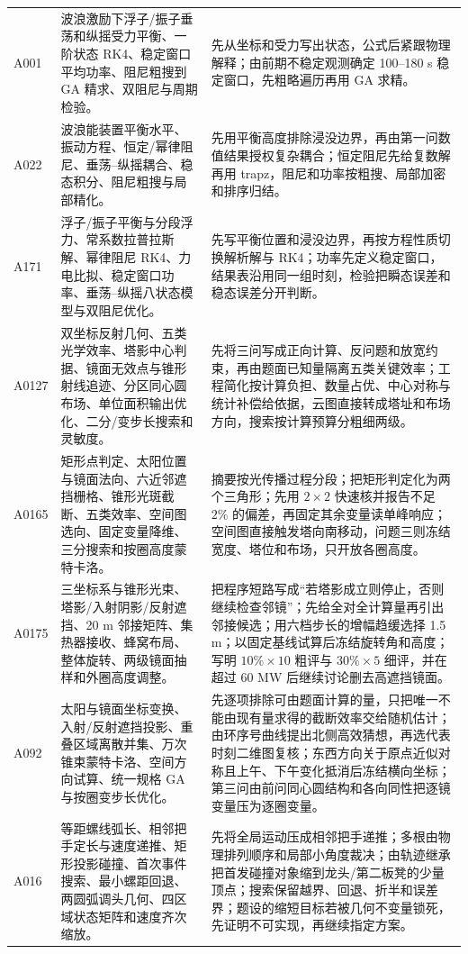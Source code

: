 \begin{longtable}{p{1.4cm}p{5.2cm}p{7.0cm}}
A001 & 波浪激励下浮子/振子垂荡和纵摇受力平衡、一阶状态 RK4、稳定窗口平均功率、阻尼粗搜到 GA 精求、双阻尼与周期检验。 &
先从坐标和受力写出状态，公式后紧跟物理解释；由前期不稳定观测确定 100--180 s 稳定窗口，先粗略遍历再用 GA 求精。\\
A022 & 波浪能装置平衡水平、振动方程、恒定/幂律阻尼、垂荡--纵摇耦合、稳态积分、阻尼粗搜与局部精化。 &
先用平衡高度排除浸没边界，再由第一问数值结果授权复杂耦合；恒定阻尼先给复数解再用 trapz，阻尼和功率按粗搜、局部加密和排序归结。\\
A171 & 浮子/振子平衡与分段浮力、常系数拉普拉斯解、幂律阻尼 RK4、力电比拟、稳定窗口功率、垂荡--纵摇八状态模型与双阻尼优化。 &
先写平衡位置和浸没边界，再按方程性质切换解析解与 RK4；功率先定义稳定窗口，结果表沿用同一组时刻，检验把瞬态误差和稳态误差分开判断。\\
A0127 & 双坐标反射几何、五类光学效率、塔影中心判据、镜面无效点与锥形射线追迹、分区同心圆布场、单位面积输出优化、二分/变步长搜索和灵敏度。 &
先将三问写成正向计算、反问题和放宽约束，再由题面已知量隔离五类关键效率；工程简化按计算负担、数量占优、中心对称与统计补偿给依据，云图直接转成塔址和布场方向，搜索按计算预算分粗细两级。\\
A0165 & 矩形点判定、太阳位置与镜面法向、六近邻遮挡栅格、锥形光斑截断、五类效率、空间图选向、固定变量降维、三分搜索和按圈高度蒙特卡洛。 &
摘要按光传播过程分段；把矩形判定化为两个三角形；先用 $2\times2$ 快速核并报告不足 $2\%$ 的偏差，再固定其余变量读单峰响应；空间图直接触发塔向南移动，问题三则冻结宽度、塔位和布场，只开放各圈高度。\\
A0175 & 三坐标系与锥形光束、塔影/入射阴影/反射遮挡、20 m 邻接矩阵、集热器接收、蜂窝布局、整体旋转、两级镜面抽样和外圈高度调整。 &
把程序短路写成“若塔影成立则停止，否则继续检查邻镜”；先给全对全计算量再引出邻接候选；用六档步长的增幅趋缓选择 1.5 m；以固定基线试算后冻结旋转角和高度；写明 $10\%\times10$ 粗评与 $30\%\times5$ 细评，并在超过 60 MW 后继续讨论删去高遮挡镜面。\\
A092 & 太阳与镜面坐标变换、入射/反射遮挡投影、重叠区域离散并集、万次锥束蒙特卡洛、空间方向试算、统一规格 GA 与按圈变步长优化。 &
先逐项排除可由题面计算的量，只把唯一不能由现有量求得的截断效率交给随机估计；由环序号曲线提出北侧高效猜想，再选代表时刻二维图复核；东西方向关于原点近似对称且上午、下午变化抵消后冻结横向坐标；第三问由前问同心圆结构和各向同性把逐镜变量压为逐圈变量。\\
A016 & 等距螺线弧长、相邻把手定长与速度递推、矩形投影碰撞、首次事件搜索、最小螺距回退、两圆弧调头几何、四区域状态矩阵和速度齐次缩放。 &
先将全局运动压成相邻把手递推；多根由物理排列顺序和局部小角度裁决；由轨迹继承把首发碰撞对象缩到龙头/第二板凳的少量顶点；搜索保留越界、回退、折半和误差界；题设的缩短目标若被几何不变量锁死，先证明不可实现，再继续指定方案。\\

\end{longtable}
